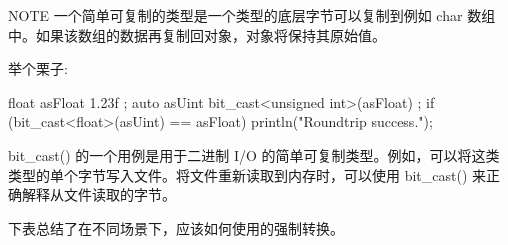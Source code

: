 \begin{myNotic}{NOTE}
一个简单可复制的类型是一个类型的底层字节可以复制到例如 char 数组中。如果该数组的数据再复制回对象，对象将保持其原始值。
\end{myNotic}

举个栗子:

\begin{cpp}
float asFloat { 1.23f };
auto asUint { bit_cast<unsigned int>(asFloat) };
if (bit_cast<float>(asUint) == asFloat) { println("Roundtrip success."); }
\end{cpp}

bit\_cast() 的一个用例是用于二进制 I/O 的简单可复制类型。例如，可以将这类类型的单个字节写入文件。将文件重新读取到内存时，可以使用 bit\_cast() 来正确解释从文件读取的字节。


下表总结了在不同场景下，应该如何使用的强制转换。

